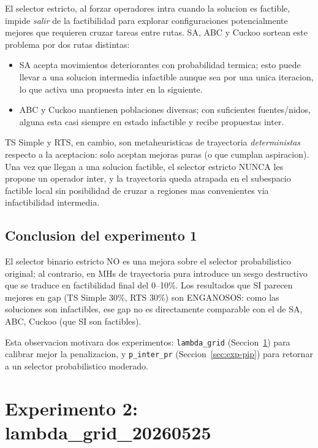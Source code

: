 El selector estricto, al forzar operadores intra cuando la solucion es
factible, impide \emph{salir} de la factibilidad para explorar
configuraciones potencialmente mejores que requieren cruzar tareas
entre rutas. SA, ABC y Cuckoo sortean este problema por dos rutas
distintas:

\begin{itemize}
\item SA acepta movimientos deteriorantes con probabilidad termica;
  esto puede llevar a una solucion intermedia infactible aunque sea
  por una unica iteracion, lo que activa una propuesta inter en la
  siguiente.
\item ABC y Cuckoo mantienen poblaciones diversas; con suficientes
  fuentes/nidos, alguna esta casi siempre en estado infactible y
  recibe propuestas inter.
\end{itemize}

TS Simple y RTS, en cambio, son metaheuristicas de trayectoria
\emph{deterministas} respecto a la aceptacion: solo aceptan mejoras
puras (o que cumplan aspiracion). Una vez que llegan a una solucion
factible, el selector estricto NUNCA les propone un operador inter, y
la trayectoria queda atrapada en el subespacio factible local sin
posibilidad de cruzar a regiones mas convenientes via infactibilidad
intermedia.

\subsection{Conclusion del experimento 1}

El selector binario estricto NO es una mejora sobre el selector
probabilistico original; al contrario, en MHs de trayectoria pura
introduce un sesgo destructivo que se traduce en factibilidad final
del 0--10\%. Los resultados que SI parecen mejores en gap (TS Simple
30\%, RTS 30\%) son ENGANOSOS: como las soluciones son infactibles,
ese gap no es directamente comparable con el de SA, ABC, Cuckoo (que
SI son factibles).

Esta observacion motivara dos experimentos: \texttt{lambda\_grid}
(Seccion~\ref{sec:exp-lambda}) para calibrar mejor la penalizacion, y
\texttt{p\_inter\_pr} (Seccion~\ref{sec:exp-pip}) para retornar a un
selector probabilistico moderado.

\section{Experimento 2: lambda\_grid\_20260525}
\label{sec:exp-lambda}

